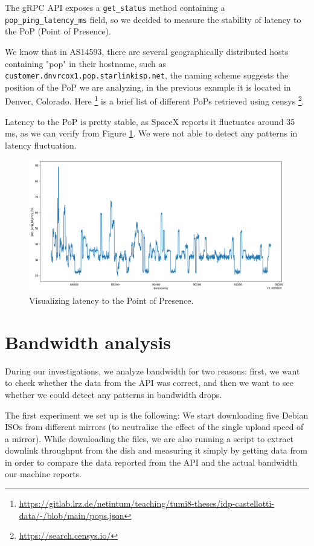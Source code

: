 \documentclass[IN,11pt,twoside,openright,idp,english]{tumthesis}
\begin{document}
The gRPC API exposes a \texttt{get\_status} method containing a \texttt{pop\_ping\_latency\_ms} field, so we decided to measure the stability of latency to the PoP (Point of Presence). 

We know that in AS14593, there are several geographically distributed hosts containing "pop" in their hostname, such as \texttt{customer.dnvrcox1.pop.starlinkisp.net}, the naming scheme suggests the position of the PoP we are analyzing, in the previous example it is located in Denver, Colorado. Here \footnote{\url{https://gitlab.lrz.de/netintum/teaching/tumi8-theses/idp-castellotti-data/-/blob/main/pops.json}} is a brief list of different PoPs retrieved using censys \footnote{\url{https://search.censys.io/}}.

Latency to the PoP is pretty stable, as SpaceX reports it fluctuates around 35 ms, as we can verify from Figure \ref{fig:vis-latency}. We were not able to detect any patterns in latency fluctuation.

\begin{figure}
    \centeringed
    \includegraphics[width=1\columnwidth]{img/latency.png}
    \caption{Visualizing latency to the Point of Presence.}
    \label{fig:vis-latency}
\end{figure}

\section{Bandwidth analysis}

During our investigations, we analyze bandwidth for two reasons: first, we want to check whether the data from the API was correct, and then we want to see whether we could detect any patterns in bandwidth drops.

The first experiment we set up is the following: We start downloading five Debian ISOs from different mirrors (to neutralize the effect of the single upload speed of a mirror). While downloading the files, we are also running a script to extract downlink throughput from the dish and measuring it simply by getting data from  in order to compare the data reported from the API and the actual bandwidth our machine reports.
\end{document}
